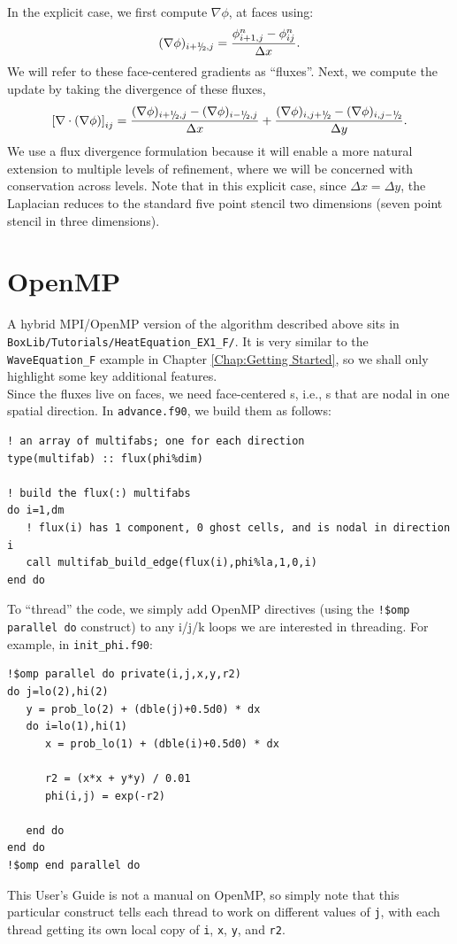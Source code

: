 In the explicit case, we first compute $\nabla\phi$, at faces using:
\begin{equation}
(\nabla\phi)_{i+\myhalf,j} = \frac{\phi_{i+1,j}^n-\phi_{ij}^n}{\Delta x}.
\end{equation}
We will refer to these face-centered gradients as ``fluxes''.
Next, we compute the update by taking the divergence of these fluxes,
\begin{equation}
\left[\nabla\cdot(\nabla\phi)\right]_{ij} = \frac{(\nabla\phi)_{i+\myhalf,j}-(\nabla\phi)_{i-\myhalf,j}}{\Delta x} + \frac{(\nabla\phi)_{i,j+\myhalf}-(\nabla\phi)_{i,j-\myhalf}}{\Delta y}.
\end{equation}
We use a flux divergence formulation because it will enable a more natural 
extension to multiple levels of refinement, where we will be concerned with
conservation across levels.  Note that in this explicit case, since $\Delta x = \Delta y$, 
the Laplacian reduces to the standard five point stencil two dimensions
(seven point stencil in three dimensions).  

\section{OpenMP}\label{Sec:OpenMP}

A hybrid MPI/OpenMP version of the algorithm described above sits in 
{\tt BoxLib/Tutorials/HeatEquation\_EX1\_F/}.  It is very similar to the
{\tt WaveEquation\_F} example in Chapter \ref{Chap:Getting Started}, so we shall
only highlight some key additional features.\\

Since the fluxes live on faces, we need face-centered \MultiFab s, i.e.,
\MultiFab s that are nodal in one spatial direction.  In {\tt advance.f90},
we build them as follows:
\begin{lstlisting}[backgroundcolor=\color{light-green}]
! an array of multifabs; one for each direction
type(multifab) :: flux(phi%dim) 

! build the flux(:) multifabs
do i=1,dm
   ! flux(i) has 1 component, 0 ghost cells, and is nodal in direction i
   call multifab_build_edge(flux(i),phi%la,1,0,i)
end do
\end{lstlisting}

To ``thread'' the code, we simply add OpenMP directives (using the {\tt !\$omp parallel do} construct) to any i/j/k loops
we are interested in threading.  For example, in {\tt init\_phi.f90}:
\begin{lstlisting}[backgroundcolor=\color{light-green}]
!$omp parallel do private(i,j,x,y,r2)
do j=lo(2),hi(2)
   y = prob_lo(2) + (dble(j)+0.5d0) * dx
   do i=lo(1),hi(1)
      x = prob_lo(1) + (dble(i)+0.5d0) * dx

      r2 = (x*x + y*y) / 0.01
      phi(i,j) = exp(-r2)

   end do
end do
!$omp end parallel do
\end{lstlisting}
This User's Guide is not a manual on OpenMP, so simply note that this particular 
construct tells each thread to work on different values of {\tt j}, with each 
thread getting its own local copy of {\tt i}, {\tt x}, {\tt y}, and {\tt r2}.\\

